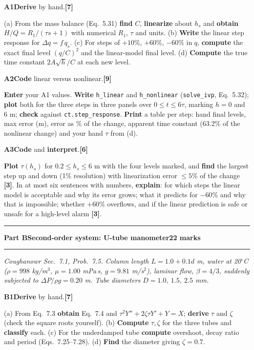 \documentclass[10pt,a4paper]{article}
\newcommand{\code}[1]{\texttt{#1}}
\newcommand{\cv}[1]{\textbf{#1}}   %
\newcommand{\mk}[1]{\textbf{[#1]}}
\newcommand{\qhead}[3]{\textbf{#1}\enspace #2\hfill\mk{#3}\par\vspace{1pt}}
\newcommand{\examsection}[3]{%
  \par\vspace{6pt}
  \noindent\rule{\linewidth}{1.4pt}\par\vspace{2pt}
  {\large\bfseries Part #1\quad #2}\hfill {\small\textbf{#3 marks}}\par
  \vspace{1pt}\noindent\rule{\linewidth}{0.4pt}\par\vspace{3pt}}
\newcommand{\sectionnote}[1]{{\small\itshape #1}\par\vspace{3pt}}
\newlength{\qgap}\setlength{\qgap}{4pt}
\newenvironment{qblock}{\par\noindent\begin{minipage}{\linewidth}\small}{\end{minipage}\par\vspace{\qgap}}
\begin{document}
\begin{qblock}
\qhead{A1}{\cv{Derive} by hand.}{7}
(a) From the mass balance (Eq.\ 5.31) \cv{find} $C$, \cv{linearize} about $h_s$ and \cv{obtain} $H/Q=R_1/(\tau s+1)$ with numerical $R_1$, $\tau$ and units. (b) \cv{Write} the linear step response for $\Delta q=f\,q_s$. (c) For steps of $+10\%$, $+60\%$, $-60\%$ in $q$, \cv{compute} the exact final level $(q/C)^2$ and the linear-model final level. (d) \cv{Compute} the true time constant $2A\sqrt h/C$ at each new level.
\end{qblock}

\begin{qblock}
\qhead{A2}{\cv{Code} linear versus nonlinear.}{9}
\cv{Enter} your A1 values. \cv{Write} \code{h\_linear} and \code{h\_nonlinear} (\code{solve\_ivp}, Eq.\ 5.32); \cv{plot} both for the three steps in three panels over $0\le t\le6\tau$, marking $h=0$ and 6 m; \cv{check} against \code{ct.step\_response}. \cv{Print} a table per step: hand final levels, max error (m), error as \% of the change, apparent time constant (63.2\% of the nonlinear change) and your hand $\tau$ from (d).
\end{qblock}

\begin{qblock}
\qhead{A3}{\cv{Code} and \cv{interpret}.}{6}
\cv{Plot} $\tau(h_s)$ for $0.2\le h_s\le6$ m with the four levels marked, and \cv{find} the largest step up and down (1\% resolution) with linearization error $\le5\%$ of the change \mk{3}. In at most six sentences with numbers, \cv{explain}: for which steps the linear model is acceptable and why its error grows; what it predicts for $-60\%$ and why that is impossible; whether $+60\%$ overflows, and if the linear prediction is safe or unsafe for a high-level alarm \mk{3}.
\end{qblock}

\examsection{B}{Second-order system: U-tube manometer}{22}
\sectionnote{Coughanowr Sec.\ 7.1, Prob.\ 7.5. Column length $L=1.0+0.1d$ m, water at 20$^\circ$C ($\rho=998$ kg/m$^3$, $\mu=1.00$ mPa\,s, $g=9.81$ m/s$^2$), laminar flow, $\beta=4/3$, suddenly subjected to $\Delta P/\rho g=0.20$ m. Tube diameters $D=1.0,\ 1.5,\ 2.5$ mm.}

\begin{qblock}
\qhead{B1}{\cv{Derive} by hand.}{7}
(a) From Eq.\ 7.3 \cv{obtain} Eq.\ 7.4 and $\tau^2Y''+2\zeta\tau Y'+Y=X$; \cv{derive} $\tau$ and $\zeta$ (check the square roots yourself). (b) \cv{Compute} $\tau,\zeta$ for the three tubes and \cv{classify} each. (c) For the underdamped tube \cv{compute} overshoot, decay ratio and period (Eqs.\ 7.25--7.28). (d) \cv{Find} the diameter giving $\zeta=0.7$.
\end{qblock}
\end{document}
